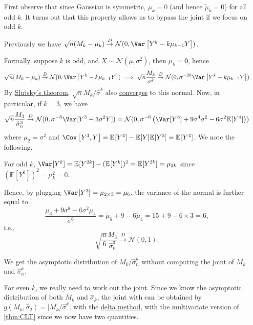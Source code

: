 First observe that since Gaussian is symmetric, \(\mu _k = 0\) (and hence \(\widetilde{\mu} _k = 0\)) for all odd \(k\). It turns out that this property allows us to bypass the joint if we focus on odd \(k\).

\begin{prev}
	Previously we have \(\sqrt{n} (M_k - \mu _k) \overset{D}{\to} \mathcal{N} (0, \Var_{}\left[Y^k - k \mu _{k-1} Y\right] )\).
\end{prev}

Formally, suppose \(k\) is odd, and \(X \sim \mathcal{N} (\mu , \sigma ^2)\), then \(\mu _k = 0\), hence
\[
	\sqrt{n} (M_k - \mu _k) \overset{D}{\to} \mathcal{N} (0, \Var_{}\left[Y^k - k \mu _{k-1} Y\right] )
	\implies \sqrt{n} \frac{M_k}{\sigma ^k} \overset{D}{\to} \mathcal{N} (0, \sigma ^{-2k} \Var_{}\left[Y^k - k \mu _{k-1} Y\right] )
\]
By \hyperref[col:Slutsky]{Slutsky's theorem}, \(\sqrt{n} M_k / \hat{\sigma} ^k\) also \hyperref[def:converge-in-distribution]{converges} to this normal. Now, in particular, if \(k = 3\), we have
\[
	\sqrt{n} \frac{M_3}{\hat{\sigma} _n^3}
	\overset{D}{\to} \mathcal{N} (0, \sigma ^{-6} \Var_{}[Y^3 - 3 \sigma ^2 Y] )
	= \mathcal{N} (0, \sigma ^{-6} \left( \Var_{}[Y^3] + 9 \sigma ^4 \sigma ^2 - 6 \sigma ^2 \mathbb{E}_{}[Y^4] \right) )
\]
where  \(\mu _2 = \sigma ^2\) and \(\Cov_{}\left[Y^3 , Y\right] = \mathbb{E}_{}[Y^4] - \mathbb{E}_{}[Y] \mathbb{E}_{}[Y^3] = \mathbb{E}_{}[Y^4] \). We note the following.

\begin{note}
	For odd \(k\), \(\Var_{}[Y^k] = \mathbb{E}_{}[Y^{2k} ] - (\mathbb{E}_{}[Y^k] )^2 = \mathbb{E}_{}[Y^{2k} ] = \mu _{2k}\) since \((\mathbb{E}_{}[Y^k] )^2 = \mu _k^2 = 0\).
\end{note}

Hence, by plugging \(\Var_{}[Y^3] = \mu _{2 \times 3} = \mu _6\), the variance of the normal is further equal to
\[
	\frac{\mu _6 + 9 \sigma ^6 - 6 \sigma ^2 \mu _4}{\sigma ^6}
	= \widetilde{\mu} _6 + 9 - 6 \widetilde{\mu} _4
	= 15 + 9 - 6 \times 3
	= 6,
\]
i.e.,
\[
	\sqrt{\frac{n}{6}} \frac{M_3}{\hat{\sigma} _n^3}
	\overset{D}{\to} \mathcal{N} (0, 1).
\]

\begin{remark}
	We get the asymptotic distribution of \(M_k / \hat{\sigma} _n^k\) without computing the joint of \(M_k\) and \(\hat{\sigma} _n^k\).
\end{remark}

For even \(k\), we really need to work out the joint. Since we know the asymptotic distribution of both \(M_k\) and \(\hat{\sigma} _k\), the joint with can be obtained by \(g(M_k , \hat{\sigma} _2) = \vert M_k / \hat{\sigma} ^k \vert \) with the \hyperref[thm:delta-method]{delta method}, with the multivariate version of \autoref{thm:CLT} since we now have two quantities.

